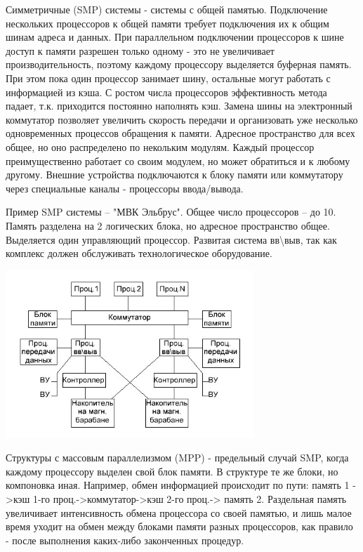\documentclass[unicode, 12pt, a4paper, oneside]{article}
\begin{document}
Симметричные (SMP) системы - системы с общей памятью. Подключение нескольких процессоров к общей памяти требует подключения их к общим шинам адреса и данных. При параллельном подключении процессоров к шине доступ к памяти разрешен только одному - это не увеличивает производительность, поэтому каждому процессору выделяется буферная память. При этом пока один процессор занимает шину, остальные могут работать с информацией из кэша. С ростом числа процессоров эффективность метода падает, т.к. приходится постоянно наполнять кэш. Замена шины на электронный коммутатор позволяет увеличить скорость передачи и организовать уже несколько одновременных процессов обращения к памяти. Адресное пространство для всех общее, но оно распределено по некольким модулям. Каждый процессор преимущественно работает со своим модулем, но может обратиться и к любому другому. Внешние устройства подключаются к блоку памяти или коммутатору через специальные каналы - процессоры ввода/вывода.

Пример SMP системы – "МВК Эльбрус". Общее число процессоров – до 10. Память разделена на 2 логических блока, но адресное пространство общее. Выделяется один управляющий процессор. Развитая система вв\textbackslash выв, так как комплекс должен обслуживать технологическое оборудование.

\begin{center}
\includegraphics[width=0.7\textwidth]{118_Elbrus.png}
\end{center}
Структуры с массовым параллелизмом (MPP) - предельный случай SMP, когда каждому процессору выделен свой блок памяти. В структуре те же блоки, но компоновка иная. Например, обмен информацией происходит по пути: память 1 ->кэш 1-го проц.->коммутатор->кэш 2-го проц.-> память 2. Раздельная память увеличивает интенсивность обмена процессора со своей памятью, и лишь малое время уходит на обмен между блоками памяти разных процессоров, как правило - после выполнения каких-либо законченных процедур.
\end{document}
